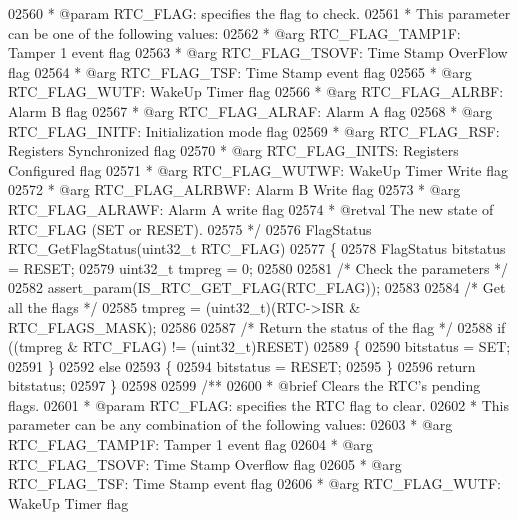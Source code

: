 \begin{DoxyCode}
02560 \textcolor{comment}{  * @param  RTC\_FLAG: specifies the flag to check.}
02561 \textcolor{comment}{  *          This parameter can be one of the following values:}
02562 \textcolor{comment}{  *            @arg RTC\_FLAG\_TAMP1F: Tamper 1 event flag}
02563 \textcolor{comment}{  *            @arg RTC\_FLAG\_TSOVF: Time Stamp OverFlow flag}
02564 \textcolor{comment}{  *            @arg RTC\_FLAG\_TSF: Time Stamp event flag}
02565 \textcolor{comment}{  *            @arg RTC\_FLAG\_WUTF: WakeUp Timer flag}
02566 \textcolor{comment}{  *            @arg RTC\_FLAG\_ALRBF: Alarm B flag}
02567 \textcolor{comment}{  *            @arg RTC\_FLAG\_ALRAF: Alarm A flag}
02568 \textcolor{comment}{  *            @arg RTC\_FLAG\_INITF: Initialization mode flag}
02569 \textcolor{comment}{  *            @arg RTC\_FLAG\_RSF: Registers Synchronized flag}
02570 \textcolor{comment}{  *            @arg RTC\_FLAG\_INITS: Registers Configured flag}
02571 \textcolor{comment}{  *            @arg RTC\_FLAG\_WUTWF: WakeUp Timer Write flag}
02572 \textcolor{comment}{  *            @arg RTC\_FLAG\_ALRBWF: Alarm B Write flag}
02573 \textcolor{comment}{  *            @arg RTC\_FLAG\_ALRAWF: Alarm A write flag}
02574 \textcolor{comment}{  * @retval The new state of RTC\_FLAG (SET or RESET).}
02575 \textcolor{comment}{  */}
02576 FlagStatus RTC_GetFlagStatus(uint32\_t RTC\_FLAG)
02577 \{
02578   FlagStatus bitstatus = RESET;
02579   uint32\_t tmpreg = 0;
02580 
02581   \textcolor{comment}{/* Check the parameters */}
02582   assert_param(IS\_RTC\_GET\_FLAG(RTC\_FLAG));
02583 
02584   \textcolor{comment}{/* Get all the flags */}
02585   tmpreg = (uint32\_t)(RTC->ISR & RTC_FLAGS_MASK);
02586 
02587   \textcolor{comment}{/* Return the status of the flag */}
02588   \textcolor{keywordflow}{if} ((tmpreg & RTC\_FLAG) != (uint32\_t)RESET)
02589   \{
02590     bitstatus = SET;
02591   \}
02592   \textcolor{keywordflow}{else}
02593   \{
02594     bitstatus = RESET;
02595   \}
02596   \textcolor{keywordflow}{return} bitstatus;
02597 \}
02598 
02599 \textcolor{comment}{/**}
02600 \textcolor{comment}{  * @brief  Clears the RTC's pending flags.}
02601 \textcolor{comment}{  * @param  RTC\_FLAG: specifies the RTC flag to clear.}
02602 \textcolor{comment}{  *          This parameter can be any combination of the following values:}
02603 \textcolor{comment}{  *            @arg RTC\_FLAG\_TAMP1F: Tamper 1 event flag}
02604 \textcolor{comment}{  *            @arg RTC\_FLAG\_TSOVF: Time Stamp Overflow flag }
02605 \textcolor{comment}{  *            @arg RTC\_FLAG\_TSF: Time Stamp event flag}
02606 \textcolor{comment}{  *            @arg RTC\_FLAG\_WUTF: WakeUp Timer flag}

\end{DoxyCode}
